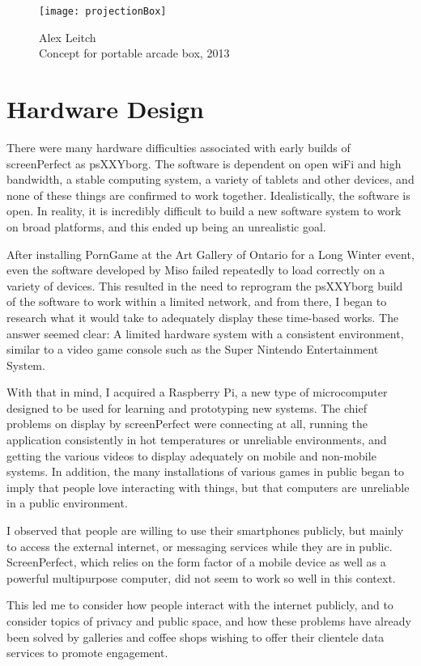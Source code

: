 \begin{figure}[!ht]
 \centering
  \texttt{[image: projectionBox]}
  \caption{Alex Leitch\\Concept for portable arcade box, 2013}
\end{figure}

\newpage

\section{Hardware Design}
There were many hardware difficulties associated with early builds of screenPerfect as psXXYborg. The software is dependent on open wiFi and high bandwidth, a stable computing system, a variety of tablets and other devices, and none of these things are confirmed to work together. Idealistically, the software is open. In reality, it is incredibly difficult to build a new software system to work on broad platforms, and this ended up being an unrealistic goal.

After installing PornGame at the Art Gallery of Ontario for a Long Winter event, even the software developed by Miso failed repeatedly to load correctly on a variety of devices. This resulted in the need to reprogram the psXXYborg build of the software to work within a limited network, and from there, I began to research what it would take to adequately display these time-based works. The answer seemed clear: A limited hardware system with a consistent environment, similar to a video game console such as the Super Nintendo Entertainment System. 

With that in mind, I acquired a Raspberry Pi, a new type of microcomputer designed to be used for learning and prototyping new systems. The chief problems on display by screenPerfect were connecting at all, running the application consistently in hot temperatures or unreliable environments, and getting the various videos to display adequately on mobile and non-mobile systems. In addition, the many installations of various games in public began to imply that people love interacting with things, but that computers are unreliable in a public environment. 

I observed that people are willing to use their smartphones publicly, but mainly to access the external internet, or messaging services while they are in public. ScreenPerfect, which relies on the form factor of a mobile device as well as a powerful multipurpose computer, did not seem to work so well in this context.

This led me to consider how people interact with the internet publicly, and to consider topics of privacy and public space, and how these problems have already been solved by galleries and coffee shops wishing to offer their clientele data services to promote engagement.

